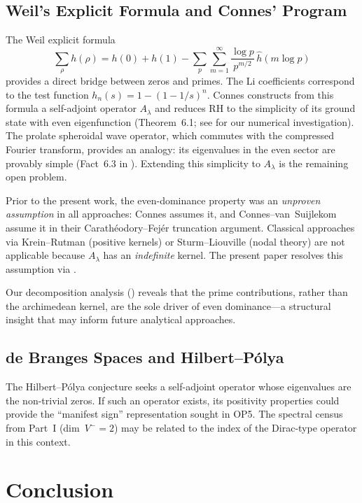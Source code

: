 \documentclass[12pt,a4paper]{article}
\theoremstyle{definition}
\theoremstyle{remark}
\begin{document}
\subsection{Weil's Explicit Formula and Connes' Program}
The Weil explicit formula
\[ \sum_\rho h(\rho) = h(0) + h(1) - \sum_p \sum_{m=1}^\infty \frac{\log p}{p^{m/2}}\,\hat{h}(m\log p) \]
provides a direct bridge between zeros and primes. The Li coefficients correspond to the test function $h_n(s) = 1-(1-1/s)^n$. Connes \cite{Connes2026} constructs from this formula a self-adjoint operator $A_\lambda$ and reduces RH to the simplicity of its ground state with even eigenfunction (Theorem~6.1; see  for our numerical investigation). The prolate spheroidal wave operator, which commutes with the compressed Fourier transform, provides an analogy: its eigenvalues in the even sector are provably simple (Fact~6.3 in \cite{Connes2026}). Extending this simplicity to $A_\lambda$ is the remaining open problem.

Prior to the present work, the even-dominance property was an \emph{unproven assumption} in all approaches: Connes \cite{Connes2026} assumes it, and Connes--van~Suijlekom \cite{ConnesvS2025} assume it in their Carath\'eodory--Fej\'er truncation argument. Classical approaches via Krein--Rutman (positive kernels) or Sturm--Liouville (nodal theory) are not applicable because $A_\lambda$ has an \emph{indefinite} kernel. The present paper resolves this assumption via .

Our decomposition analysis () reveals that the prime contributions, rather than the archimedean kernel, are the sole driver of even dominance---a structural insight that may inform future analytical approaches.

\subsection{de Branges Spaces and Hilbert--P\'olya}
The Hilbert--P\'olya conjecture seeks a self-adjoint operator whose eigenvalues are the non-trivial zeros. If such an operator exists, its positivity properties could provide the ``manifest sign'' representation sought in OP5. The spectral census from Part~I (dim~$V^- = 2$) may be related to the index of the Dirac-type operator in this context.


\section{Conclusion}
\end{document}

